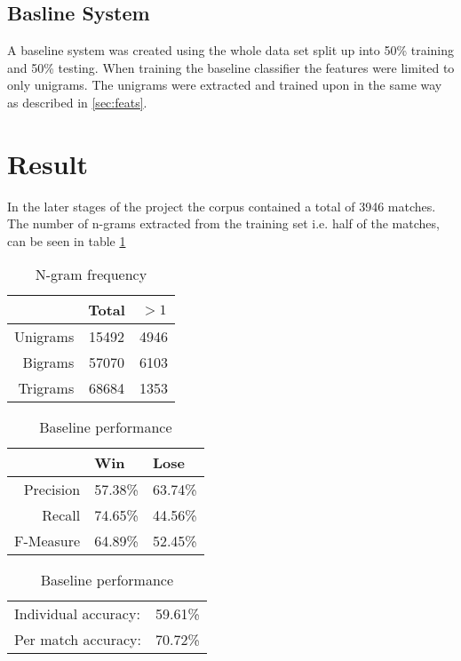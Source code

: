 \documentclass[12pt,a4paper]{article}
\begin{document}
\subsection{Basline System}
A baseline system was created using the whole data set split up into 50\% training and 50\% testing.
When training the baseline classifier the features were limited to only unigrams.
The unigrams were extracted and trained upon in the same way as described in \ref{sec:feats}.

\section{Result}
In the later stages of the project the corpus contained a total of 3946 matches.
The number of n-grams extracted from the training set i.e. half of the matches,
can be seen in table \ref{tab:n-grams}

\begin{table}[h]
    \begin{center}
        \begin{tabular}{r | c c}
                        & Total & $>1$   \\
            \hline
            Unigrams    & 15492 & 4946 \\
            Bigrams     & 57070 & 6103 \\
            Trigrams    & 68684 & 1353 \\
        \end{tabular}
        \caption{N-gram frequency}
        \label{tab:n-grams}
    \end{center}
\end{table}


\begin{table}[h]
    \begin{center}
\begin{tabular}{ r | l l }
                & Win       & Lose \\
    \hline
    Precision   & 57.38\%   & 63.74\% \\
    Recall      & 74.65\%   & 44.56\% \\
    F-Measure   & 64.89\%   & 52.45\% \\
    
\end{tabular}

\rule{0pt}{8ex}    
\begin{tabular}{ l l }
    Individual accuracy: & 59.61\% \\
    Per match accuracy:  & 70.72\%\\
\end{tabular}
\caption{Baseline performance}
\label{tab:baseline}
\end{center}
\end{table}
\end{document}
